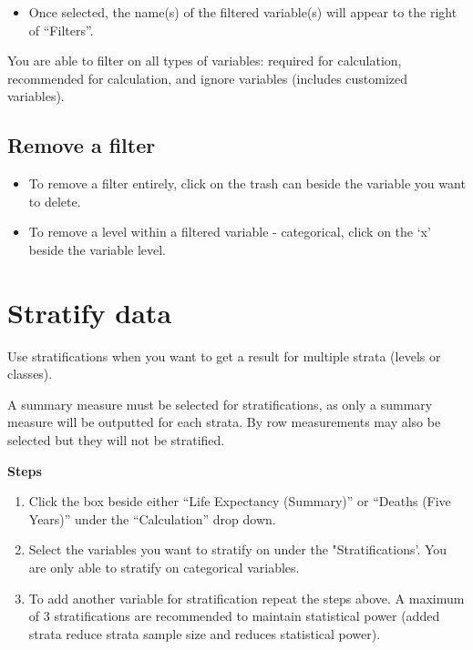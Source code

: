\documentclass[]{book}
\providecommand{\tightlist}{%
  \setlength{\itemsep}{0pt}\setlength{\parskip}{0pt}}
\begin{document}
\begin{itemize}
\tightlist
\item
  Once selected, the name(s) of the filtered variable(s) will appear to the right of ``Filters''.
\end{itemize}

You are able to filter on all types of variables: required for calculation, recommended for calculation, and ignore variables (includes customized variables).

\hypertarget{remove-a-filter}{%
\subsection{Remove a filter}\label{remove-a-filter}}

\begin{itemize}
\item
  To remove a filter entirely, click on the trash can beside the variable you want to delete.
\item
  To remove a level within a filtered variable - categorical, click on the `x' beside the variable level.
\end{itemize}

\hypertarget{stratify-data}{%
\section{Stratify data}\label{stratify-data}}

Use stratifications when you want to get a result for multiple strata (levels or classes).

A summary measure must be selected for stratifications, as only a summary measure will be outputted for each strata. By row measurements may also be selected but they will not be stratified.

\textbf{Steps}

\begin{enumerate}
\def\labelenumi{\arabic{enumi}.}
\item
  Click the box beside either ``Life Expectancy (Summary)'' or ``Deaths (Five Years)'' under the ``Calculation'' drop down.
\item
  Select the variables you want to stratify on under the "Stratifications'. You are only able to stratify on categorical variables.
\item
  To add another variable for stratification repeat the steps above. A maximum of 3 stratifications are recommended to maintain statistical power (added strata reduce strata sample size and reduces statistical power).
\end{enumerate}
\end{document}

